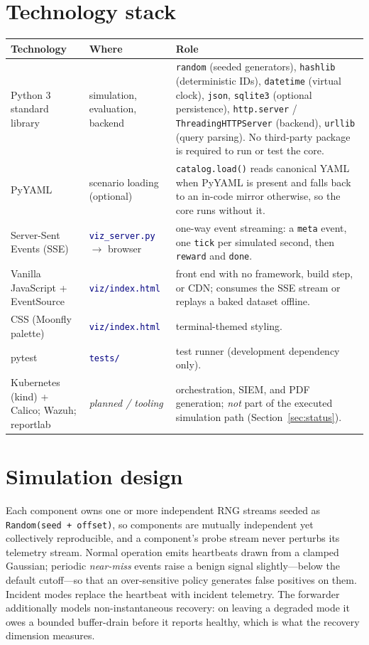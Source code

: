 \documentclass[11pt]{article}
\newcommand{\code}[1]{\texttt{\small #1}}
\newcommand{\file}[1]{\textcolor{navy}{\texttt{\small #1}}}
\begin{document}
\section{Technology stack}
\begin{longtable}{>{\RaggedRight\arraybackslash}p{3.4cm} >{\RaggedRight\arraybackslash}p{3.0cm} >{\RaggedRight\arraybackslash}p{7.4cm}}
\toprule
\textbf{Technology} & \textbf{Where} & \textbf{Role}\\
\midrule\endhead
Python 3 standard library & simulation, evaluation, backend
  & \code{random} (seeded generators), \code{hashlib} (deterministic IDs),
    \code{datetime} (virtual clock), \code{json}, \code{sqlite3} (optional
    persistence), \code{http.server} / \code{ThreadingHTTPServer} (backend),
    \code{urllib} (query parsing). No third-party package is required to run or
    test the core.\\
PyYAML & scenario loading (optional)
  & \code{catalog.load()} reads canonical YAML when PyYAML is present and falls
    back to an in-code mirror otherwise, so the core runs without it.\\
Server-Sent Events (SSE) & \file{viz\_server.py} $\to$ browser
  & one-way event streaming: a \code{meta} event, one \code{tick} per simulated
    second, then \code{reward} and \code{done}.\\
Vanilla JavaScript + EventSource & \file{viz/index.html}
  & front end with no framework, build step, or CDN; consumes the SSE stream or
    replays a baked dataset offline.\\
CSS (Moonfly palette) & \file{viz/index.html}
  & terminal-themed styling.\\
pytest & \file{tests/}
  & test runner (development dependency only).\\
Kubernetes (kind) + Calico; Wazuh; reportlab & \emph{planned / tooling}
  & orchestration, SIEM, and PDF generation; \emph{not} part of the executed
    simulation path (Section~\ref{sec:status}).\\
\bottomrule
\end{longtable}

\section{Simulation design}
Each component owns one or more independent RNG streams seeded as
\code{Random(seed + offset)}, so components are mutually independent yet
collectively reproducible, and a component's probe stream never perturbs its
telemetry stream. Normal operation emits heartbeats drawn from a clamped Gaussian;
periodic \emph{near-miss} events raise a benign signal slightly---below the
default cutoff---so that an over-sensitive policy generates false positives on
them. Incident modes replace the heartbeat with incident telemetry. The
forwarder additionally models non-instantaneous recovery: on leaving a degraded
mode it owes a bounded buffer-drain before it reports healthy, which is what the
recovery dimension measures.
\end{document}
